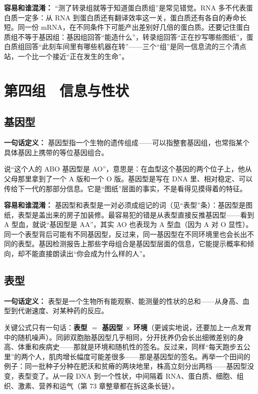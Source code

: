 \textbf{容易和谁混淆：} “测了转录组就等于知道蛋白质组”是常见错觉。RNA 多不代表蛋白质一定多：从 RNA 到蛋白质还有翻译效率这一关，蛋白质还有各自的寿命长短。同一份 mRNA，在不同条件下可能产出差别好几倍的蛋白质。还要记住蛋白质组不等于基因组：基因组回答“能造什么”，转录组回答“正在抄写哪些图纸”，蛋白质组回答“此刻车间里有哪些机器在转”——三个“组”是同一信息流的三个清点站，一个比一个接近“正在发生的生命”。

\section{第四组　信息与性状}

\subsection{基因型}

\textbf{一句话定义：} 基因型指一个生物的遗传组成——可以指整套基因组，也常指某个具体基因上携带的等位基因组合。

说“这个人的 ABO 基因型是 AO”，意思是：在血型这个基因的两个位子上，他从父母那里拿到了一个 A 版和一个 O 版。基因型是写在 DNA 里、相对稳定、可以传给下一代的那部分信息。它是“图纸”层面的事实，不是看得见摸得着的特征。

\textbf{容易和谁混淆：} 基因型和表型是一对必须成组记的词（见“表型”条）：基因型是图纸，表型是盖出来的房子加装修。最容易犯的错是从表型直接反推基因型——看到 A 型血，就说“基因型是 AA”，其实 AO 也表现为 A 型血（因为 A 对 O 显性）。同一个表型背后可能有不同基因型，反过来，同一基因型在不同环境里也会长出不同的表型。基因检测报告上那些字母组合是基因型层面的信息，它能提示概率和倾向，却不能直接朗读出“你会成为什么样的人”。

\subsection{表型}

\textbf{一句话定义：} 表型是一个生物所有能观察、能测量的性状的总和——从身高、血型到代谢速度、对某种药的反应。

关键公式只有一句话：\textbf{表型 $=$ 基因型 $\times$ 环境}（更诚实地说，还要加上一点发育中的随机噪声）。同卵双胞胎基因型几乎相同，分开抚养仍会长出细微差别的身高、体重和疾病史——那就是环境和随机性的签名。反过来，同样“每天跑步五公里”的两个人，肌肉增长幅度可能差很多——那是基因型的签名。再举一个田间的例子：同一批种子分种在肥沃和贫瘠的两块地里，株高立刻分出两档——基因型没变，表型变了。从一段 DNA 到一个性状，中间隔着 RNA、蛋白质、细胞、组织、激素、营养和运气（第 73 章整章都在拆这条长链）。

